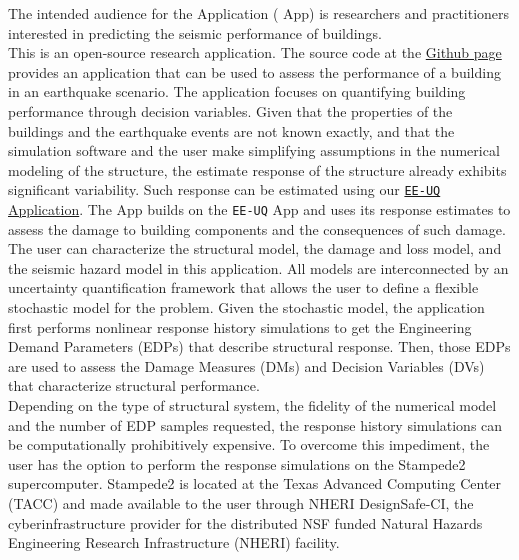 The intended audience for the \texttt{\getsoftwarename{}} Application (\texttt{\getsoftwarename{}} App) is researchers and practitioners
interested in predicting the seismic performance of buildings.\\

This is an open-source research application. The source code at
the \href{https://github.com/NHERI-SimCenter/PBE}{\texttt{\getsoftwarename{}}
Github page} provides an application that can be used to assess the performance of a building in an earthquake scenario. The application focuses on quantifying building performance through decision variables. Given that the properties of the buildings and the earthquake events are not known exactly, and that the simulation software and the user make simplifying assumptions in the numerical modeling of the structure, the estimate response of the structure already exhibits significant variability. Such response can be estimated using our \href{https://simcenter.designsafe-ci.org/research-tools/ee-uq-application/}{\texttt{EE-UQ} Application}. The \texttt{\getsoftwarename{}} App builds on the \texttt{EE-UQ} App and uses its response estimates to assess the damage to building components and the consequences of such damage.\\

The user can characterize the structural model, the damage and loss model, and the seismic hazard model in this application. All models are interconnected by an uncertainty quantification framework that allows the user to define a flexible stochastic model for the problem. Given the stochastic model, the application first performs nonlinear response history simulations to get the Engineering Demand Parameters (EDPs) that describe structural response. Then, those EDPs are used to assess the Damage Measures (DMs) and Decision Variables (DVs) that characterize structural performance.\\

Depending on the type of structural system, the fidelity of the numerical model and the number of EDP samples requested, the response history simulations can be computationally prohibitively expensive. To overcome this impediment, the user has the option to perform the response simulations on the Stampede2 supercomputer. Stampede2 is located at the Texas Advanced Computing Center (TACC) and made available to the user through NHERI DesignSafe-CI, the cyberinfrastructure provider for the distributed NSF funded Natural Hazards Engineering Research Infrastructure (NHERI) facility.\\

